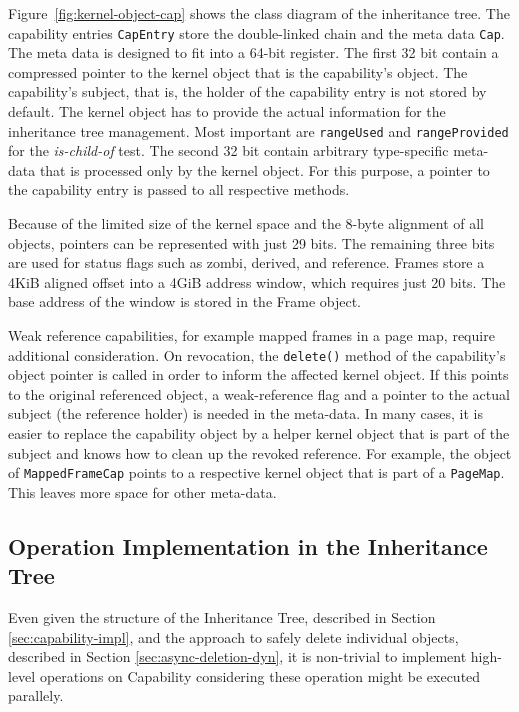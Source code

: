 Figure~\ref{fig:kernel-object-cap} shows the class diagram of the inheritance tree. The capability entries \texttt{CapEntry} store the double-linked chain and the meta data \texttt{Cap}. The meta data is designed to fit into a 64-bit register. The first 32 bit contain a compressed pointer to the kernel object that is the capability's object. The capability's subject, that is, the holder of the capability entry is not stored by default. The kernel object has to provide the actual information for the inheritance tree management. Most important are \texttt{rangeUsed} and \texttt{rangeProvided} for the \emph{is-child-of} test. The second 32 bit contain arbitrary type-specific meta-data that is processed only by the kernel object. For this purpose, a pointer to the capability entry is passed to all respective methods.

Because of the limited size of the kernel space and the 8-byte alignment of all objects, pointers can be represented with just 29 bits. The remaining three bits are used for status flags such as zombi, derived, and reference. Frames store a 4KiB aligned offset into a 4GiB address window, which requires just 20 bits. The base address of the window is stored in the Frame object.

Weak reference capabilities, for example mapped frames in a page map, require additional consideration. On revocation, the \texttt{delete()} method of the capability's object pointer is called in order to inform the affected kernel object. If this points to the original referenced object, a weak-reference flag and a pointer to the actual subject (the reference holder) is needed in the meta-data. In many cases, it is easier to replace the capability object by a helper kernel object that is part of the subject and knows how to clean up the revoked reference. For example, the object of \texttt{MappedFrameCap} points to a respective kernel object that is part of a \texttt{PageMap}. This leaves more space for other meta-data.

\subsection{Operation Implementation in the Inheritance Tree}
\label{sec:capability-ops} 

Even given the structure of the Inheritance Tree, described in Section \ref{sec:capability-impl}, and the approach to safely delete individual objects, described in Section \ref{sec:async-deletion-dyn}, it is non-trivial to implement high-level operations on Capability considering these operation might be executed parallely.

